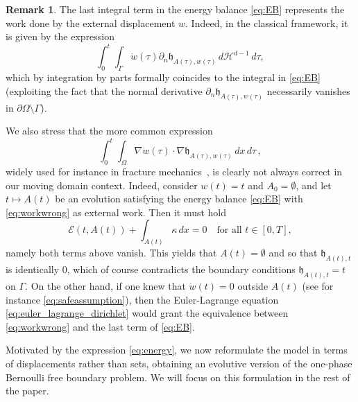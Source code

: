 \documentclass[a4paper,11pt,reqno]{amsart}
\numberwithin{equation}{section}
\theoremstyle{definition}
\newtheorem{remark}[teo]{Remark}
\theoremstyle{remark}
\begin{document}
\begin{remark}
    The last integral term in the energy balance \eqref{eq:EB} represents the work done by the external displacement $w$. Indeed, in the classical framework, it is given by the expression
    \begin{equation}
        \int_0^t  \int_\Gamma \dot w(\tau)\partial_n \mathfrak{h}_{A(\tau),w(\tau)} \, d\mathcal H^{d-1}\, d\tau,
    \end{equation}
    which by integration by parts formally coincides to the integral in \eqref{eq:EB} (exploiting the fact that the normal derivative $\partial_n \mathfrak{h}_{A(\tau),w(\tau)}$ necessarily vanishes in $\partial\Omega\setminus \Gamma$).

    We also stress that the more common expression 
    \begin{equation}\label{eq:workwrong}
        \int_0^t  \int_\Omega \nabla \dot w(\tau)\cdot \nabla \mathfrak{h}_{A(\tau),w(\tau)} \, dx\, d\tau \,,
    \end{equation}
    widely used for instance in fracture mechanics~\cite{DalMasoToader}, is clearly not always correct in our moving domain context. Indeed, consider $w(t)=t$ and $A_0=\emptyset$, and let $t\mapsto A(t)$ be an evolution satisfying the energy balance \eqref{eq:EB} with \eqref{eq:workwrong} as external work. Then it must hold
    \begin{equation}
        \mathcal E(t,A(t))+\int_{A(t)}\kappa\,d x=0\quad\text{for all }t\in [0,T],
    \end{equation}
    namely both terms above vanish. This yields that $A(t)=\emptyset$ and so that $\mathfrak{h}_{A(t),t}$ is identically $0$, which of course contradicts the boundary conditions $\mathfrak{h}_{A(t),t}=t$ on $\Gamma$. On the other hand, if one knew that $\dot w(t)=0$ outside $A(t)$ (see for instance \eqref{eq:safeassumption}), then the Euler-Lagrange equation \eqref{eq:euler_lagrange_dirichlet} would grant the equivalence between \eqref{eq:workwrong} and the last term of \eqref{eq:EB}.    
\end{remark}

Motivated by the expression \eqref{eq:energy}, we now reformulate the model in terms of displacements rather than sets, obtaining an evolutive version of the one-phase Bernoulli free boundary problem. We will focus on this formulation in the rest of the paper.
\end{document}
